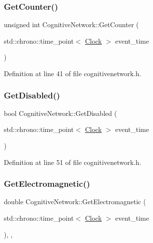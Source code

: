 \subsubsection{\texorpdfstring{Get\+Counter()}{GetCounter()}}
{\footnotesize\ttfamily unsigned int Cognitive\+Network\+::\+Get\+Counter (\begin{DoxyParamCaption}\item[{std\+::chrono\+::time\+\_\+point$<$ \hyperlink{universe_8h_a0ef8d951d1ca5ab3cfaf7ab4c7a6fd80}{Clock} $>$}]{event\+\_\+time }\end{DoxyParamCaption})\hspace{0.3cm}{\ttfamily [inline]}}



Definition at line 41 of file cognitivenetwork.\+h.

\mbox{\label{class_cognitive_network_aa64c93ecec84b57b25e1fdb173795f9b}} 
\subsubsection{\texorpdfstring{Get\+Disabled()}{GetDisabled()}}
{\footnotesize\ttfamily bool Cognitive\+Network\+::\+Get\+Disabled (\begin{DoxyParamCaption}\item[{std\+::chrono\+::time\+\_\+point$<$ \hyperlink{universe_8h_a0ef8d951d1ca5ab3cfaf7ab4c7a6fd80}{Clock} $>$}]{event\+\_\+time }\end{DoxyParamCaption})\hspace{0.3cm}{\ttfamily [inline]}}



Definition at line 51 of file cognitivenetwork.\+h.

\mbox{\label{class_cognitive_network_a09e5a1c774c84529a7adfe56fadb7467}} 
\subsubsection{\texorpdfstring{Get\+Electromagnetic()}{GetElectromagnetic()}}
{\footnotesize\ttfamily double Cognitive\+Network\+::\+Get\+Electromagnetic (\begin{DoxyParamCaption}\item[{std\+::chrono\+::time\+\_\+point$<$ \hyperlink{universe_8h_a0ef8d951d1ca5ab3cfaf7ab4c7a6fd80}{Clock} $>$}]{event\+\_\+time }\end{DoxyParamCaption})\hspace{0.3cm}{\ttfamily [inline]}, {\ttfamily [final]}, {\ttfamily [virtual]}}



